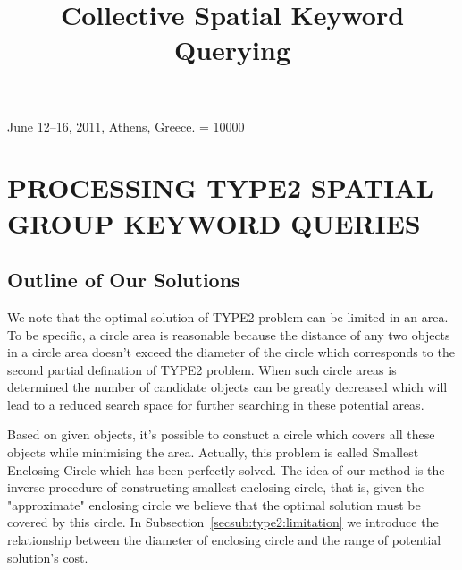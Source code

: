 \documentclass{sig-alternate}
\begin{document}
 {June 12--16, 2011, Athens, Greece.}
\widowpenalty = 10000
%

\title{Collective Spatial Keyword Querying}
%
%



\maketitle


\section{PROCESSING TYPE2 SPATIAL GROUP KEYWORD QUERIES} \label{sec:type2}
\subsection{Outline of Our Solutions}\label{secsub:type2:outline}
We note that the optimal solution of \textsf{TYPE2} problem can be limited
in an area. To be specific, a circle area is reasonable because the distance
of any two objects in a circle area doesn't exceed the diameter of the circle
which corresponds to the second partial defination of \textsf{TYPE2} problem. 
When such circle areas is determined the number of candidate objects can be greatly decreased
which will lead to a reduced search space for further searching in these potential areas.
%

Based on given objects, it's possible to constuct a circle which covers all these
objects while minimising the area. Actually, this problem is called \textsf{Smallest Enclosing Circle}
which has been perfectly solved.
The idea of our method is the inverse procedure of constructing smallest enclosing circle,
that is, given the "approximate" enclosing circle we believe that the optimal
solution must be covered by this circle.
In Subsection~\ref{secsub:type2:limitation} we introduce the relationship
between the diameter of enclosing circle and the range of potential solution's cost.
%
\end{document}
